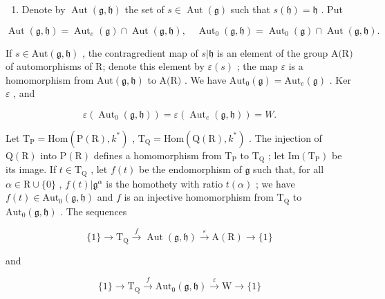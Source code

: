 \begin{enumerate}
\def\labelenumi{\arabic{enumi})}
\setcounter{enumi}{17}
\tightlist
\item
  Denote by \(\operatorname{Aut}(\mathfrak{g},\mathfrak{h})\) the set of \(s\in \operatorname{Aut}(\mathfrak{g})\) such that \(s(\mathfrak{h}) = \mathfrak{h}\) . Put
\end{enumerate}

\[
\operatorname{Aut} (\mathfrak {g}, \mathfrak {h}) = \operatorname{Aut} _ {e} (\mathfrak {g}) \cap \operatorname{Aut} (\mathfrak {g}, \mathfrak {h}), \quad \operatorname{Aut} _ {0} (\mathfrak {g}, \mathfrak {h}) = \operatorname{Aut} _ {0} (\mathfrak {g}) \cap \operatorname{Aut} (\mathfrak {g}, \mathfrak {h}).
\]

If \(s \in \text{Aut}(\mathfrak{g}, \mathfrak{h})\) , the contragredient map of \(s | \mathfrak{h}\) is an element of the group \(\text{A(R)}\) of automorphisms of R; denote this element by \(\varepsilon(s)\) ; the map \(\varepsilon\) is a homomorphism from \(\text{Aut}(\mathfrak{g}, \mathfrak{h})\) to \(\text{A(R)}\) . We have \(\text{Aut}_{0}(\mathfrak{g}) = \text{Aut}_{e}(\mathfrak{g})\) . Ker \(\varepsilon\) , and

\[
\varepsilon (\operatorname{Aut} _ {0} (\mathfrak {g}, \mathfrak {h})) = \varepsilon (\operatorname{Aut} _ {e} (\mathfrak {g}, \mathfrak {h})) = W.
\]

Let \(\mathrm{T}_{\mathrm{P}} = \mathrm{Hom}(\mathrm{P}(\mathrm{R}), k^{*})\) , \(\mathrm{T}_{\mathrm{Q}} = \mathrm{Hom}(\mathrm{Q}(\mathrm{R}), k^{*})\) . The injection of \(\mathrm{Q}(\mathrm{R})\) into \(\mathrm{P}(\mathrm{R})\) defines a homomorphism from \(\mathrm{T}_{\mathrm{P}}\) to \(\mathrm{T}_{\mathrm{Q}}\) ; let \(\mathrm{Im}(\mathrm{T}_{\mathrm{P}})\) be its image. If \(t \in \mathrm{T}_{\mathrm{Q}}\) , let \(f(t)\) be the endomorphism of \(\mathfrak{g}\) such that, for all \(\alpha \in \mathrm{R} \cup \{0\}\) , \(f(t)|\mathfrak{g}^{\alpha}\) is the homothety with ratio \(t(\alpha)\) ; we have \(f(t)\in \mathrm{Aut}_{0}(\mathfrak{g},\mathfrak{h})\) and \(f\) is an injective homomorphism from \(\mathrm{T}_{\mathrm{Q}}\) to \(\mathrm{Aut}_0(\mathfrak{g},\mathfrak{h})\) . The sequences

\[
\{1 \} \longrightarrow \mathrm {T_ {Q}} \stackrel {{f}} {{\longrightarrow}} \operatorname{Aut} (\mathfrak {g}, \mathfrak {h}) \stackrel {{\varepsilon}} {{\longrightarrow}} \mathrm{A(R)} \longrightarrow \{1 \}
\]

and

\[
\{1 \} \longrightarrow \mathrm{T} _ {\mathrm{Q}} \stackrel {f} {\longrightarrow} \mathrm{Aut} _ {0} (\mathfrak {g}, \mathfrak {h}) \stackrel {\varepsilon} {\longrightarrow} \mathrm{W} \longrightarrow \{1 \}
\]

